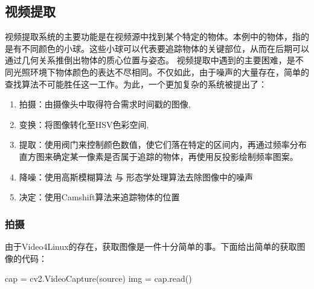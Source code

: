 
\subsection{视频提取}
视频提取系统的主要功能是在视频源中找到某个特定的物体。本例中的物体，指的是有不同颜色的小球。这些小球可以代表要追踪物体的关键部位，从而在后期可以通过几何关系推倒出物体的质心位置与姿态。
视频提取中遇到的主要困难，是不同光照环境下物体颜色的表达不尽相同。不仅如此，由于噪声的大量存在，简单的查找算法不可能胜任这一工作。为此，一个更加复杂的系统被提出了：
\begin{enumerate}
  \item 拍摄：由摄像头中取得符合需求时间戳的图像,
  \item 变换：将图像转化至HSV色彩空间,
  \item 提取：使用阀门来控制颜色数值，使它们落在特定的区间内，再通过频率分布直方图来确定某一像素是否属于追踪的物体，再使用反投影绘制频率图案。
  \item 降噪：使用高斯模糊算法 与 形态学处理算法去除图像中的噪声
  \item 决定：使用Camshift算法来追踪物体的位置
\end{enumerate}
\subsubsection{拍摄}
由于Video4Linux的存在，获取图像是一件十分简单的事。下面给出简单的获取图像的代码：
\lstset{language=python}
\begin{python}
cap = cv2.VideoCapture(source)
img = cap.read()
\end{python}
